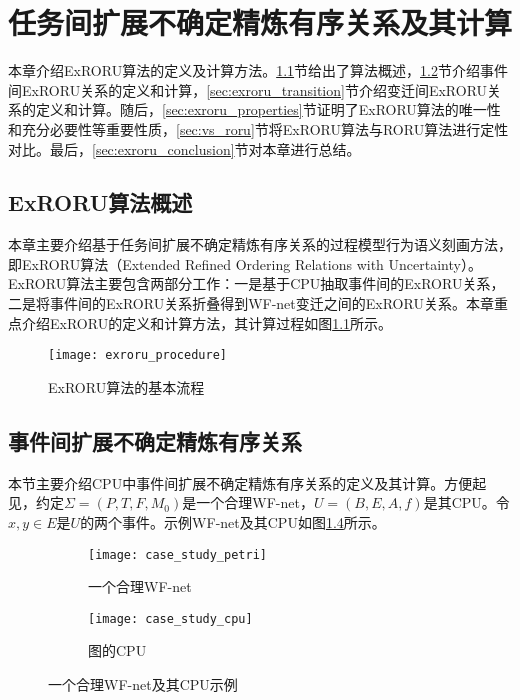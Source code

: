 
\chapter{任务间扩展不确定精炼有序关系及其计算}\label{cha:exroru}
本章介绍ExRORU算法的定义及计算方法。\ref{sec:exroru_intro}节给出了算法概述，\ref{sec:exroru_event}节介绍事件间ExRORU关系的定义和计算，\ref{sec:exroru_transition}节介绍变迁间ExRORU关系的定义和计算。随后，\ref{sec:exroru_properties}节证明了ExRORU算法的唯一性和充分必要性等重要性质，\ref{sec:vs_roru}节将ExRORU算法与RORU算法进行定性对比。最后，\ref{sec:exroru_conclusion}节对本章进行总结。

\section{ExRORU算法概述}\label{sec:exroru_intro}
本章主要介绍基于任务间扩展不确定精炼有序关系的过程模型行为语义刻画方法，即ExRORU算法（Extended Refined Ordering Relations with Uncertainty）。ExRORU算法主要包含两部分工作：一是基于CPU抽取事件间的ExRORU关系，二是将事件间的ExRORU关系折叠得到WF-net变迁之间的ExRORU关系。本章重点介绍ExRORU的定义和计算方法，其计算过程如图\ref{fig:exroru_procedure}所示。

\begin{figure}[htbp]
  \centering
  \texttt{[image: exroru\_procedure]}
  \caption{ExRORU算法的基本流程\label{fig:exroru_procedure}}
\end{figure}


\section{事件间扩展不确定精炼有序关系}\label{sec:exroru_event}
本节主要介绍CPU中事件间扩展不确定精炼有序关系的定义及其计算。方便起见，约定$\Sigma=(P,T,F,M_{0})$是一个合理WF-net，$U=(B,E,A,f)$是其CPU。令$x,y\in E$是$U$的两个事件。示例WF-net及其CPU如图\ref{fig:case_study}所示。

\begin{figure}[htbp]
  \centering
  \begin{subfigure}{1\textwidth}
  	\centering
  	\texttt{[image: case\_study\_petri]}
  	\caption{一个合理WF-net}
  	\label{fig:case_study_petri}
  \end{subfigure}
  \begin{subfigure}{1\textwidth}
  	\vspace{1em}
  	\centering
  	\texttt{[image: case\_study\_cpu]}
  	\caption{图的CPU}
  	\label{fig:case_study_cpu}
  \end{subfigure}
  \vspace{6pt}
  \caption{一个合理WF-net及其CPU示例}
  \label{fig:case_study}
\end{figure}

